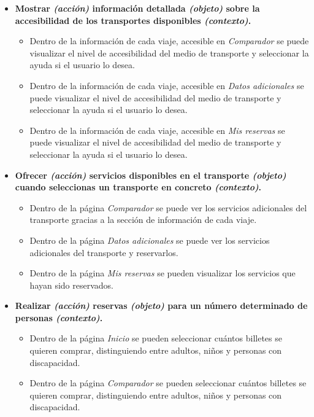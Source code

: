 \begin{itemize}
    \item \textbf{Mostrar \textit{(acción)} información detallada \textit{(objeto)} sobre la accesibilidad de los transportes 
        disponibles \textit{(contexto)}.}
        \begin{itemize}
            \item Dentro de la información de cada viaje, accesible en \textit{Comparador} se puede visualizar el nivel de accesibilidad del medio de
                transporte y seleccionar la ayuda si el usuario lo desea.
            \item Dentro de la información de cada viaje, accesible en \textit{Datos adicionales} se puede visualizar el nivel de accesibilidad del medio de
                transporte y seleccionar la ayuda si el usuario lo desea.
            \item Dentro de la información de cada viaje, accesible en \textit{Mis reservas} se puede visualizar el nivel de accesibilidad del medio de
                transporte y seleccionar la ayuda si el usuario lo desea.
        \end{itemize}
    
    \item \textbf{Ofrecer \textit{(acción)} servicios disponibles en el transporte \textit{(objeto)} cuando seleccionas un transporte
        en concreto \textit{(contexto)}.}
        \begin{itemize}
            \item Dentro de la página \textit{Comparador} se puede ver los servicios adicionales del transporte gracias a la sección
                de información de cada viaje.
            \item Dentro de la página \textit{Datos adicionales} se puede ver los servicios adicionales del transporte y reservarlos.
            \item Dentro de la página \textit{Mis reservas} se pueden visualizar los servicios que hayan sido reservados.
        \end{itemize}
    
    \item \textbf{Realizar \textit{(acción)} reservas \textit{(objeto)} para un número determinado de personas \textit{(contexto)}.}
        \begin{itemize}
            \item Dentro de la página \textit{Inicio} se pueden seleccionar cuántos billetes se
                quieren comprar, distinguiendo entre adultos, niños y personas con discapacidad.
            \item Dentro de la página \textit{Comparador} se pueden seleccionar cuántos billetes se
                quieren comprar, distinguiendo entre adultos, niños y personas con discapacidad.
        \end{itemize}


\end{itemize}
